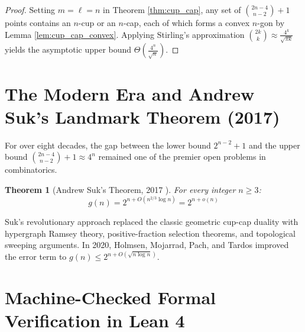 \documentclass[11pt,a4paper]{article}
\newtheorem{theorem}{Theorem}[section]
\theoremstyle{definition}
\begin{document}
\begin{proof}
Setting $m = \ell = n$ in Theorem \ref{thm:cup_cap}, any set of $\binom{2n-4}{n-2} + 1$ points contains an $n$-cup or an $n$-cap, each of which forms a convex $n$-gon by Lemma \ref{lem:cup_cap_convex}.
Applying Stirling's approximation $\binom{2k}{k} \approx \frac{4^k}{\sqrt{\pi k}}$ yields the asymptotic upper bound $\Theta\left(\frac{4^n}{\sqrt{n}}\right)$.
\end{proof}

\section{The Modern Era and Andrew Suk's Landmark Theorem (2017)}

For over eight decades, the gap between the lower bound $2^{n-2} + 1$ and the upper bound $\binom{2n-4}{n-2} + 1 \approx 4^n$ remained one of the premier open problems in combinatorics.

\begin{theorem}[Andrew Suk's Theorem, 2017 \cite{suk2017}]\label{thm:suk}
For every integer $n \ge 3$:
\begin{equation}\label{eq:suk_bound}
g(n) = 2^{n + O(n^{2/3} \log n)} = 2^{n + o(n)}
\end{equation}
\end{theorem}

Suk's revolutionary approach replaced the classic geometric cup-cap duality with hypergraph Ramsey theory, positive-fraction selection theorems, and topological sweeping arguments.
In 2020, Holmsen, Mojarrad, Pach, and Tardos \cite{holmsen2020} improved the error term to $g(n) \le 2^{n + O(\sqrt{n \log n})}$.

\section{Machine-Checked Formal Verification in Lean 4}
\end{document}
